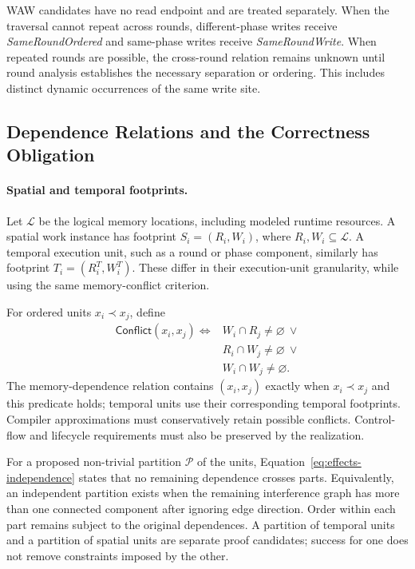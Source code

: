 WAW candidates have no read endpoint and are treated separately. When
the traversal cannot repeat across rounds, different-phase writes receive
\emph{SameRoundOrdered} and same-phase writes receive
\emph{SameRoundWrite}. When repeated rounds are possible, the cross-round
relation remains unknown until round analysis establishes the necessary
separation or ordering. This includes distinct dynamic occurrences of
the same write site.

\subsection{Dependence Relations and the Correctness Obligation}
\label{app:effects-independence}
\paragraph{Spatial and temporal footprints.}
Let $\mathcal L$ be the logical memory locations, including modeled
runtime resources. A spatial work instance has footprint
$S_i=(R_i,W_i)$, where $R_i,W_i\subseteq\mathcal L$.
A temporal execution unit, such as a round or phase component, similarly
has footprint $T_i=(R_i^T,W_i^T)$. These differ in their execution-unit
granularity, while using the same memory-conflict criterion.

For ordered units $x_i\prec x_j$, define
\[
\begin{split}
\mathsf{Conflict}(x_i,x_j)\iff{}&
W_i\cap R_j\ne\varnothing\ \lor\\
&R_i\cap W_j\ne\varnothing\ \lor\\
&W_i\cap W_j\ne\varnothing.
\end{split}
\]
The memory-dependence relation contains $(x_i,x_j)$ exactly when
$x_i\prec x_j$ and this predicate holds; temporal units use their
corresponding temporal footprints. Compiler approximations must
conservatively retain possible conflicts. Control-flow and lifecycle
requirements must also be preserved by the realization.

For a proposed non-trivial partition $\mathcal P$ of the units,
Equation~\ref{eq:effects-independence} states that no remaining dependence
crosses parts. Equivalently, an independent partition exists when the
remaining interference graph has more than one connected component
after ignoring edge direction. Order within each part remains subject
to the original dependences. A partition of temporal units and a
partition of spatial units are separate proof candidates; success for
one does not remove constraints imposed by the other.


